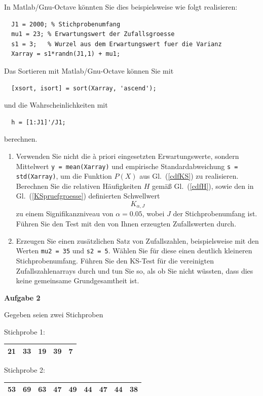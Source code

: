 In Matlab/Gnu-Octave könnten Sie dies beispielsweise wie folgt realisieren:
\begin{lstlisting}
  J1 = 2000; % Stichprobenumfang
  mu1 = 23; % Erwartungswert der Zufallsgroesse
  s1 = 3;   % Wurzel aus dem Erwartungswert fuer die Varianz
  Xarray = s1*randn(J1,1) + mu1;
\end{lstlisting}
Das Sortieren mit Matlab/Gnu-Octave können Sie mit
\begin{lstlisting}
  [xsort, isort] = sort(Xarray, 'ascend');
\end{lstlisting}
und die Wahrscheinlichkeiten mit
\begin{lstlisting}
  h = [1:J1]'/J1;
\end{lstlisting}
berechnen.

\begin{enumerate}
\item Verwenden Sie nicht die {\`a} priori eingesetzten Erwartungswerte,
 sondern Mittelwert \texttt{y = mean(Xarray)} und empirische Standardabweichung
 \texttt{s = std(Xarray)}, um die Funktion $P(X)$ aus Gl.~(\ref{cdfKS})
 zu realisieren. Berechnen Sie die relativen Häufigkeiten $H$ gemäß
 Gl.~(\ref{cdfH}), sowie den in Gl.~(\ref{KSpruefgroesse}) definierten
 Schwellwert
  $$K_{\alpha, J}$$
 zu einem Signifikanzniveau von $\alpha = 0.05$,
 wobei $J$ der Stichprobenumfang ist.
 Führen Sie den Test mit den von Ihnen erzeugten Zufallswerten durch.
\item Erzeugen Sie einen zusätzlichen Satz von Zufallszahlen, beispielsweise mit den
 Werten \texttt{mu2 = 35} und \texttt{s2 = 5}. Wählen Sie für diese einen
 deutlich kleineren Stichprobenumfang. Führen Sie den KS-Test für die
 vereinigten Zufallszahlenarrays durch und tun Sie so, als ob Sie nicht
 wüssten, dass dies keine gemeinsame Grundgesamtheit ist.
\end{enumerate}



\textbf{Aufgabe 2}

Gegeben seien zwei Stichproben

Stichprobe 1:

\begin{tabular}{|c|c|c|c|c|}
\hline
21 & 33 & 19 & 39 & 7\\
\hline
\end{tabular}

Stichprobe 2:

\begin{tabular}{|c|c|c|c|c|c|c|c|c|}
\hline
53 & 69 & 63 & 47 & 49 & 44 & 47 & 44 & 38\\
\hline
\end{tabular}

